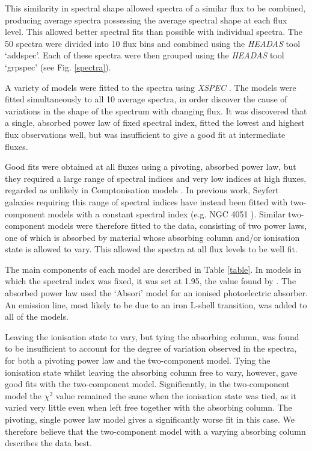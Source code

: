 \documentclass[letters,useAMS,usenatbib]{samnote}
\begin{document}
This similarity in spectral shape allowed spectra of a similar flux to be combined, producing average spectra possessing the average spectral shape at each flux level.
This allowed better spectral fits than possible with individual spectra. The 50 spectra were divided into 10 flux bins and combined using the {\it HEADAS} tool
`addspec'. Each of these spectra were then grouped using the {\it HEADAS} tool `grpspec' (see Fig. \ref{spectra}).

A variety of models were fitted to the spectra using {\it XSPEC} \citep{arnaud}. The models were fitted simultaneously to all 10 average
spectra, in order discover the cause of variations in the shape of the spectrum with changing flux. It was discovered that a single, absorbed power law of fixed
spectral index, fitted the lowest and highest flux observations well, but was insufficient to give a good fit at intermediate fluxes.

Good fits were obtained at all fluxes using a pivoting, absorbed power law, but they required a large range of spectral indices and very low indices at
high fluxes, regarded as unlikely in Comptonisation models \citep{ponti}. In previous work, Seyfert galaxies requiring this range of spectral indices have instead been
fitted with two-component models with a constant spectral index (e.g. NGC 4051 \citep{ponti}). Similar two-component models were therefore fitted to the data,
consisting of two power laws, one of which is absorbed by material whose absorbing column and/or ionisation state is allowed  to vary. This allowed the spectra at all
flux levels to be well fit. 

The main components of each model are described in Table \ref{table}. In models in which the spectral index was fixed, it was set at 1.95, the value found by
\citet{risaliti13}. The absorbed power law used the `Absori' model for an ionised photoelectric absorber. An emission line, most likely to be due to an iron L-shell
transition, was added to all of the models. 

Leaving the ionisation state to vary, but tying the absorbing column, was found to be insufficient to account for the degree of variation observed in the spectra, for
both a pivoting power law and the two-component model. Tying the ionisation state whilst leaving the absorbing column free to vary, however, gave good fits with the
two-component model. Significantly, in the two-component model the $\chi^2$ value remained the same when the ionisation state was tied, as it varied very little even
when left free together with the absorbing column. The pivoting, single power law model gives a significantly worse fit in this case. We therefore believe
that the two-component model with a varying absorbing column describes the data best.
\end{document}
